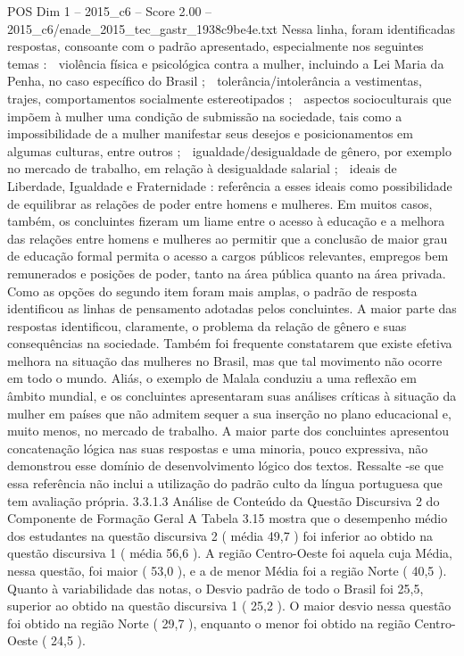 \begin{textsample}{POS Dim 1 – 2015\_c6 – Score 2.00 – 2015\_c6/enade\_2015\_tec\_gastr\_1938c9be4e.txt}
Nessa linha, foram identificadas respostas, consoante com o padrão apresentado, especialmente nos seguintes temas :  violência física e psicológica contra a mulher, incluindo a Lei Maria da Penha, no caso específico do Brasil ;  tolerância/intolerância a vestimentas, trajes, comportamentos socialmente estereotipados ;  aspectos socioculturais que impõem à mulher uma condição de submissão na sociedade, tais como a impossibilidade de a mulher manifestar seus desejos e posicionamentos em algumas culturas, entre outros ;  igualdade/desigualdade de gênero, por exemplo no mercado de trabalho, em relação à desigualdade salarial ;  ideais de Liberdade, Igualdade e Fraternidade : referência a esses ideais como possibilidade de equilibrar as relações de poder entre homens e mulheres.
Em muitos casos, também, os concluintes fizeram um liame entre o acesso à educação e a melhora das relações entre homens e mulheres ao permitir que a conclusão de maior grau de educação formal permita o acesso a cargos públicos relevantes, empregos bem remunerados e posições de poder, tanto na área pública quanto na área privada.
Como as opções do segundo item foram mais amplas, o padrão de resposta identificou as linhas de pensamento adotadas pelos concluintes.
A maior parte das respostas identificou, claramente, o problema da relação de gênero e suas consequências na sociedade.
Também foi frequente constatarem que existe efetiva melhora na situação das mulheres no Brasil, mas que tal movimento não ocorre em todo o mundo.
Aliás, o exemplo de Malala conduziu a uma reflexão em âmbito mundial, e os concluintes apresentaram suas análises críticas à situação da mulher em países que não admitem sequer a sua inserção no plano educacional e, muito menos, no mercado de trabalho.
A maior parte dos concluintes apresentou concatenação lógica nas suas respostas e uma minoria, pouco expressiva, não demonstrou esse domínio de desenvolvimento lógico dos textos.
Ressalte -se que essa referência não inclui a utilização do padrão culto da língua portuguesa que tem avaliação própria. 3.3.1.3 Análise de Conteúdo da Questão Discursiva 2 do Componente de Formação Geral A Tabela 3.15 mostra que o desempenho médio dos estudantes na questão discursiva 2 ( média 49,7 ) foi inferior ao obtido na questão discursiva 1 ( média 56,6 ).
A região Centro-Oeste foi aquela cuja Média, nessa questão, foi maior ( 53,0 ), e a de menor Média foi a região Norte ( 40,5 ).
Quanto à variabilidade das notas, o Desvio padrão de todo o Brasil foi 25,5, superior ao obtido na questão discursiva 1 ( 25,2 ).
O maior desvio nessa questão foi obtido na região Norte ( 29,7 ), enquanto o menor foi obtido na região Centro-Oeste ( 24,5 ).

\end{textsample}
